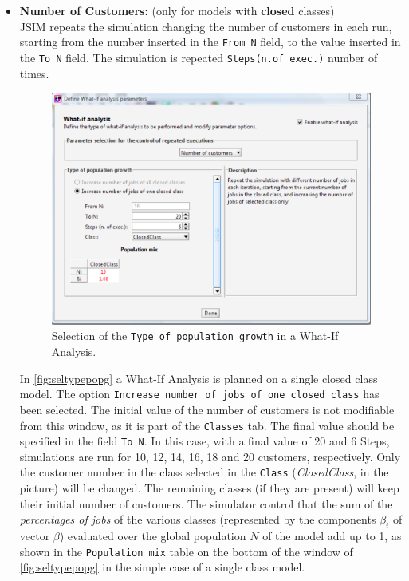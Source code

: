 \begin{itemize}
\item \textbf{Number of Customers:} (only for models with
\textbf{closed} classes)\\
JSIM repeats the simulation changing
the number of customers in each run, starting from the number
inserted in the \texttt{From N} field, to the value inserted in
the \texttt{To N} field. The simulation is repeated
\texttt{Steps(n.of exec.)} number of times.
\begin{figure}[hbt]
    \begin{center}
        \includegraphics[scale=.5]{img/jsimg/7.3.eps}
    \end{center}
    \caption{Selection of the \texttt{Type of population growth} in
    a What-If Analysis.}
    \label{fig:seltypepopg}
\end{figure}
In \autoref{fig:seltypepopg} a What-If Analysis is planned on a
single closed class model. The option \texttt{Increase number of
jobs of one closed class} has been selected. The initial value of
the number of customers is not modifiable from this window, as it
is part of the \texttt{Classes} tab. The final value should be
specified in the field \texttt{To N}. In this case, with a final
value of 20 and 6 Steps, simulations are run for 10, 12, 14, 16,
18 and 20 customers, respectively. Only the customer number in the
class selected in the \texttt{Class} (\emph{ClosedClass}, in the
picture) will be changed. The remaining classes (if they are
present) will keep their initial number of customers. The
simulator control that the sum of the \emph{percentages of jobs}
of the various classes (represented by the components $\beta_i$ of
vector \textbf{$\beta$}) evaluated over the global population $N$
of the model add up to 1, as shown in the \texttt{Population mix}
table on the bottom of the window of \autoref{fig:seltypepopg} in
the simple case of a single class model.


\end{itemize}
